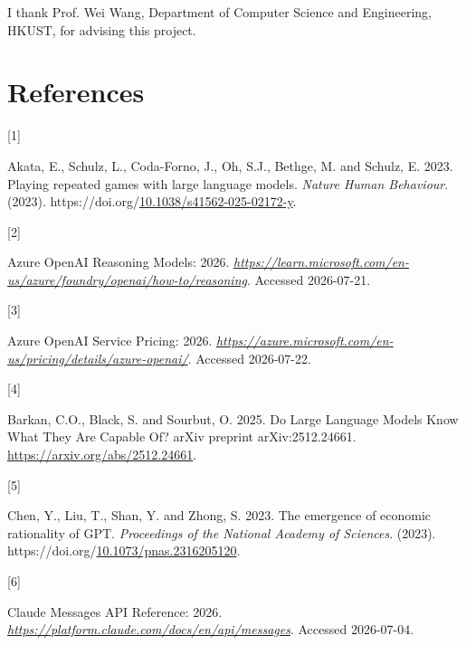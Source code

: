 \documentclass[
  10pt,
]{article}
\newlength{\cslhangindent}
\newlength{\csllabelwidth}
\newenvironment{CSLReferences}[2] %
 {\begin{list}{}{%
  \setlength{\itemindent}{0pt}
  \setlength{\leftmargin}{0pt}
  \setlength{\parsep}{0pt}
  \ifodd #1
   \setlength{\leftmargin}{\cslhangindent}
   \setlength{\itemindent}{-1\cslhangindent}
  \fi
  \setlength{\itemsep}{#2\baselineskip}}}
 {\end{list}}
\newcommand{\CSLLeftMargin}[1]{\parbox[t]{\csllabelwidth}{\strut#1\strut}}
\newcommand{\CSLRightInline}[1]{\parbox[t]{\linewidth - \csllabelwidth}{\strut#1\strut}}
\begin{document}
\begin{ack}
I thank Prof. Wei Wang, Department of Computer Science and Engineering, HKUST, for advising this project.
\end{ack}

\section{References}\label{references}

\protect{}\label{refs}
\begin{CSLReferences}{0}{0}
\CSLLeftMargin{{[}1{]} }%
\CSLRightInline{Akata, E., Schulz, L., Coda-Forno, J., Oh, S.J., Bethge, M. and Schulz, E. 2023. {Playing repeated games with large language models}. \emph{Nature Human Behaviour}. (2023). https://doi.org/\href{https://doi.org/10.1038/s41562-025-02172-y}{10.1038/s41562-025-02172-y}.}

\CSLLeftMargin{{[}2{]} }%
\CSLRightInline{{Azure OpenAI Reasoning Models}: 2026. \href{https://learn.microsoft.com/en-us/azure/foundry/openai/how-to/reasoning}{\emph{https://learn.microsoft.com/en-us/azure/foundry/openai/how-to/reasoning}}. Accessed 2026-07-21.}

\CSLLeftMargin{{[}3{]} }%
\CSLRightInline{{Azure OpenAI Service Pricing}: 2026. \href{https://azure.microsoft.com/en-us/pricing/details/azure-openai/}{\emph{https://azure.microsoft.com/en-us/pricing/details/azure-openai/}}. Accessed 2026-07-22.}

\CSLLeftMargin{{[}4{]} }%
\CSLRightInline{Barkan, C.O., Black, S. and Sourbut, O. 2025. {Do Large Language Models Know What They Are Capable Of?} arXiv preprint arXiv:2512.24661. \url{https://arxiv.org/abs/2512.24661}.}

\CSLLeftMargin{{[}5{]} }%
\CSLRightInline{Chen, Y., Liu, T., Shan, Y. and Zhong, S. 2023. {The emergence of economic rationality of GPT}. \emph{Proceedings of the National Academy of Sciences}. (2023). https://doi.org/\href{https://doi.org/10.1073/pnas.2316205120}{10.1073/pnas.2316205120}.}

\CSLLeftMargin{{[}6{]} }%
\CSLRightInline{{Claude Messages API Reference}: 2026. \href{https://platform.claude.com/docs/en/api/messages}{\emph{https://platform.claude.com/docs/en/api/messages}}. Accessed 2026-07-04.}


\end{CSLReferences}
\end{document}
